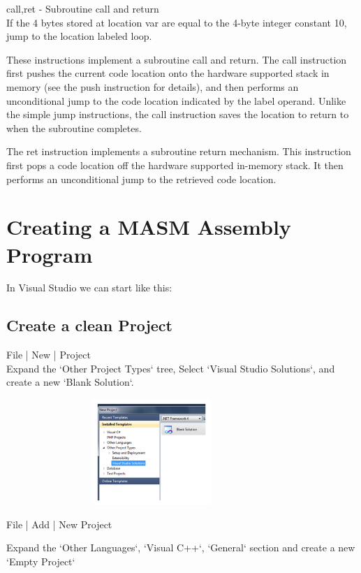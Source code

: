 \documentclass[12pt]{extarticle}
\begin{document}
call,ret - Subroutine call and return \\

If the 4 bytes stored at location var are equal to the 4-byte integer constant 10, jump to the location labeled loop. 

These instructions implement a subroutine call and return. The call instruction first pushes the current code location onto the hardware supported stack in memory (see the push instruction for details), and then performs an unconditional jump to the code location indicated by the label operand. Unlike the simple jump instructions, the call instruction saves the location to return to when the subroutine completes. 

The ret instruction implements a subroutine return mechanism. This instruction first pops a code location off the hardware supported in-memory stack. It then performs an unconditional jump to the retrieved code location. 


\section{Creating a  MASM Assembly Program}

In Visual Studio we can start like this:

\subsection{Create a clean Project}

File | New | Project \\
Expand the ‘Other Project Types‘ tree, Select ‘Visual Studio Solutions‘, and create a new ‘Blank Solution‘.

\begin{center}

    \includegraphics[width=11cm, height=4cm]{tt}
    
 \end{center}
 \newpage 
File | Add | New Project

Expand the ‘Other Languages‘, ‘Visual C++‘, ‘General‘ section and create a new ‘Empty Project‘
\end{document}
